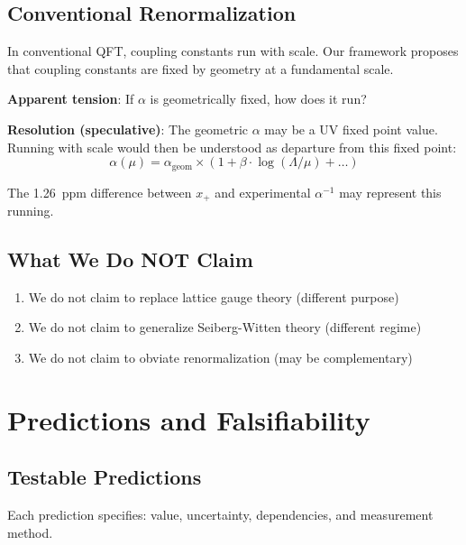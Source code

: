 \documentclass[11pt,a4paper]{article}
\theoremstyle{definition}
\theoremstyle{remark}
\begin{document}
\subsection{Conventional Renormalization}

In conventional QFT, coupling constants run with scale. Our framework proposes that coupling constants are fixed by geometry at a fundamental scale.

\textbf{Apparent tension}: If $\alpha$ is geometrically fixed, how does it run?

\textbf{Resolution (speculative)}: The geometric $\alpha$ may be a UV fixed point value. Running with scale would then be understood as departure from this fixed point:
\begin{equation}
    \alpha(\mu) = \alpha_{\text{geom}} \times (1 + \beta \cdot \log(\Lambda/\mu) + \ldots)
\end{equation}

The 1.26~ppm difference between $x_+$ and experimental $\alpha^{-1}$ may represent this running.

\subsection{What We Do NOT Claim}

\begin{enumerate}
    \item We do not claim to replace lattice gauge theory (different purpose)
    \item We do not claim to generalize Seiberg-Witten theory (different regime)
    \item We do not claim to obviate renormalization (may be complementary)
\end{enumerate}

\section{Predictions and Falsifiability}

\subsection{Testable Predictions}

Each prediction specifies: value, uncertainty, dependencies, and measurement method.
\end{document}
